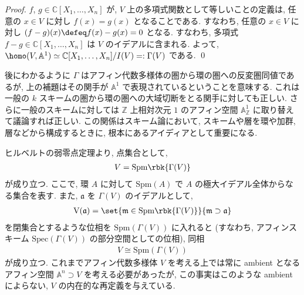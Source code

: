 \documentclass[openany, a4paper, oneside]{jsbook}
\begin{document}
\begin{proof}
$f$, $g \in \mathbb{C}[X_1,\dots,X_n]$ が,
$V$ 上の多項式関数として等しいことの定義は, 任意の $x \in V$ に対し $f (x) =g (x)$ となることである.
すなわち, 任意の $x \in V$ に対し $(f-g) (x) \defeq  f (x) -g (x) = 0$ となる.
すなわち, 多項式 $f-g \in \mathbb{C}[X_1,\dots,X_n]$ は $V$ のイデアルに含まれる.
よって,  $\homo (V,\mathbb{A}^1) \simeq \mathbb{C}[X_1,\dots,X_n]/I (V) =: \Gamma (V)$ である. \qed
\end{proof}
\begin{rem}
後にわかるように $\Gamma$ はアフィン代数多様体の圏から環の圏への反変圏同値であるが,
上の補題はその関手が $\mathbb{A}^1$ で表現されているということを意味する.
これは一般の $k$ スキームの圏から環の圏への大域切断をとる関手に対しても正しい.
さらに一般のスキームに対しては $\mathbb{Z}$ 上相対次元 $1$ のアフィン空間 $\mathbb{A}_{\mathbb{Z}}^1$ に取り替えて議論すれば正しい.
この関係はスキーム論において, スキームや層を環や加群, 層などから構成するときに, 根本にあるアイディアとして重要になる. \fin
\end{rem}
\begin{rem}\label{waheyhey-algebraic-geometry-guidance6}
ヒルベルトの弱零点定理より, 点集合として,
\begin{align}
 V
 =
 \mathrm{Spm} \rbk{\Gamma ( V )}
\end{align}
が成り立つ.
ここで, 環 $A$ に対して $\mathrm{Spm}(A)$ で $A$ の極大イデアル全体からなる集合を表す.
また, $\mathfrak{a}$ を $\Gamma ( V )$ のイデアルとして,
\begin{align}
 \mathrm{V} ( \mathfrak{a} )
 =
 \set{\mathfrak{m} \in \mathrm{Spm} \rbk{\Gamma ( V )}}{\mathfrak{m} \supset \mathfrak{a}}
\end{align}
を閉集合とするような位相を $\mathrm{Spm} \left ( \Gamma ( V ) \right)$ に入れると
(すなわち, アフィンスキーム $\mathrm{Spec} \left ( \Gamma ( V ) \right)$ の部分空間としての位相),
同相
\begin{align}
 V
 \cong
 \mathrm{Spm} \left ( \Gamma ( V ) \right)
\end{align}
が成り立つ.
これまでアフィン代数多様体 $V$ を考える上では常に ambient となるアフィン空間 $\mathbb{A}^n \supset V$ を考える必要があったが,
この事実はこのような ambient によらない, $V$ の内在的な再定義を与えている. \fin
\end{rem}
\end{document}

